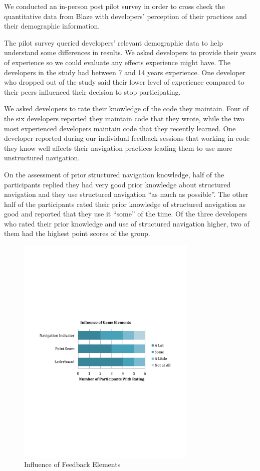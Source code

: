 \documentclass{sig-alternate}
\begin{document}
We conducted an in-person post pilot survey in order to cross check the quantitative data from Blaze with developers' perception of their practices and their demographic information.

The pilot survey queried developers' relevant demographic data to help understand some differences in results.  We asked developers to provide their years of experience so we could evaluate any effects experience might have.  The developers in the study had between 7 and 14 years experience.  One developer who dropped out of the study said their lower level of experience compared to their peers influenced their decision to stop participating.  

We asked developers to rate their knowledge of the code they maintain.  Four of the six developers reported they maintain code that they wrote, while the two most experienced developers maintain code that they recently learned.  One developer reported during our individual feedback sessions that working in code they know well affects their navigation practices leading them to use more unstructured navigation.

On the assessment of prior structured navigation knowledge, half of the participants replied they had very good prior knowledge about structured navigation and they use structured navigation ``as much as possible''.  The other half of the participants rated their prior knowledge of structured navigation as good and reported that they use it ``some'' of the time. Of the three developers who rated their prior knowledge and use of structured navigation higher, two of them had the highest point scores of the group.

\begin{figure}
	\includegraphics[width=3.4in]{ElementInfluenceChart.pdf}
	\caption{Influence of Feedback Elements}
	\label{fig:elementInfluence}
\end{figure}
\end{document}

